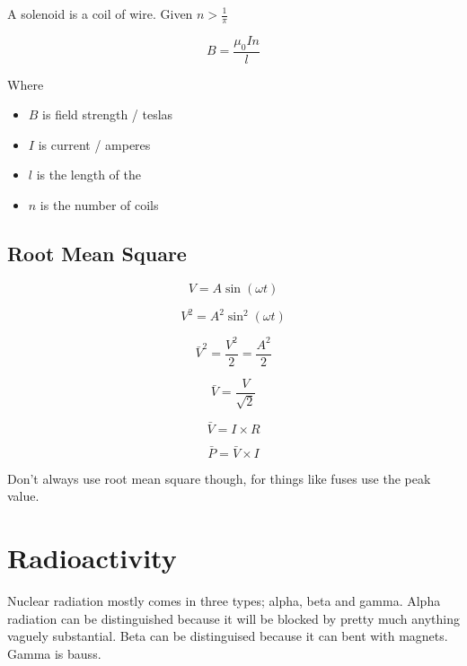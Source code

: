 \documentclass{article}
\begin{document}
A solenoid is a coil of wire. Given $n>\frac{1}{\pi}$

\[B=\frac{\mu_0In}{l}\] %

\noindent Where\begin{itemize}

    \item $B$ is field strength / teslas
    \item $I$ is current / amperes
    \item $l$ is the length of the 
    \item $n$ is the number of coils

\end{itemize}

\subsection{Root Mean Square}

\[V = A \sin \left(\omega t\right)\]

\[V^2 = A^2 \sin^2 \left(\omega t\right)\]

\[\bar{V}^2 = \frac{V^2}{2} = \frac{A^2}{2}\]

\[\bar{V} = \frac{V}{\sqrt{2}}\]


\[\bar{V} = I \times R\]

\[\bar{P} = \bar{V} \times I\]

Don't always use root mean square though, for things like fuses use the peak
value.

\section{Radioactivity}

Nuclear radiation mostly comes in three types; alpha, beta and gamma. Alpha
radiation can be distinguished because it will be blocked by pretty much
anything vaguely substantial. Beta can be distinguised because it can bent with
magnets. Gamma is bauss.
\end{document}
